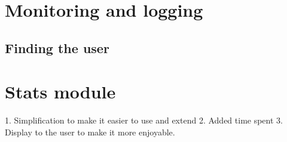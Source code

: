 \section{Monitoring and logging}\label{sec:logging}
\subsection{Finding the user}
\section{Stats module}

1. Simplification to make it easier to use and extend
2. Added time spent
3. Display to the user to make it more enjoyable.